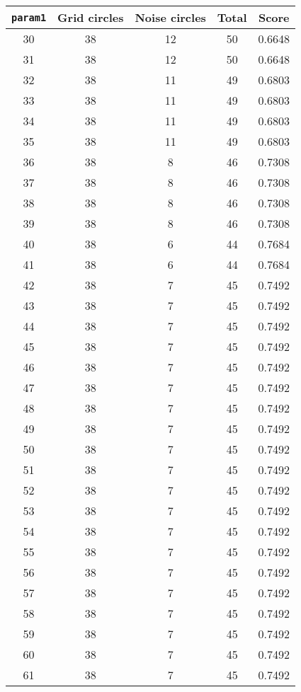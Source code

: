 \documentclass[letterpaper, 12pt]{article}
\begin{document}
\begin{longtable}{|c|c|c|c|c|}
\hline
\textbf{\texttt{param1}} & \textbf{Grid circles} & \textbf{Noise circles} & \textbf{Total} & \textbf{Score} \\
\hline
30 & 38 & 12 & 50 & 0.6648 \\
\hline
31 & 38 & 12 & 50 & 0.6648 \\
\hline
32 & 38 & 11 & 49 & 0.6803 \\
\hline
33 & 38 & 11 & 49 & 0.6803 \\
\hline
34 & 38 & 11 & 49 & 0.6803 \\
\hline
35 & 38 & 11 & 49 & 0.6803 \\
\hline
36 & 38 & 8 & 46 & 0.7308 \\
\hline
37 & 38 & 8 & 46 & 0.7308 \\
\hline
38 & 38 & 8 & 46 & 0.7308 \\
\hline
39 & 38 & 8 & 46 & 0.7308 \\
\hline
40 & 38 & 6 & 44 & 0.7684 \\
\hline
41 & 38 & 6 & 44 & 0.7684 \\
\hline
42 & 38 & 7 & 45 & 0.7492 \\
\hline
43 & 38 & 7 & 45 & 0.7492 \\
\hline
44 & 38 & 7 & 45 & 0.7492 \\
\hline
45 & 38 & 7 & 45 & 0.7492 \\
\hline
46 & 38 & 7 & 45 & 0.7492 \\
\hline
47 & 38 & 7 & 45 & 0.7492 \\
\hline
48 & 38 & 7 & 45 & 0.7492 \\
\hline
49 & 38 & 7 & 45 & 0.7492 \\
\hline
50 & 38 & 7 & 45 & 0.7492 \\
\hline
51 & 38 & 7 & 45 & 0.7492 \\
\hline
52 & 38 & 7 & 45 & 0.7492 \\
\hline
53 & 38 & 7 & 45 & 0.7492 \\
\hline
54 & 38 & 7 & 45 & 0.7492 \\
\hline
55 & 38 & 7 & 45 & 0.7492 \\
\hline
56 & 38 & 7 & 45 & 0.7492 \\
\hline
57 & 38 & 7 & 45 & 0.7492 \\
\hline
58 & 38 & 7 & 45 & 0.7492 \\
\hline
59 & 38 & 7 & 45 & 0.7492 \\
\hline
60 & 38 & 7 & 45 & 0.7492 \\
\hline
61 & 38 & 7 & 45 & 0.7492 \\

\end{longtable}
\end{document}
